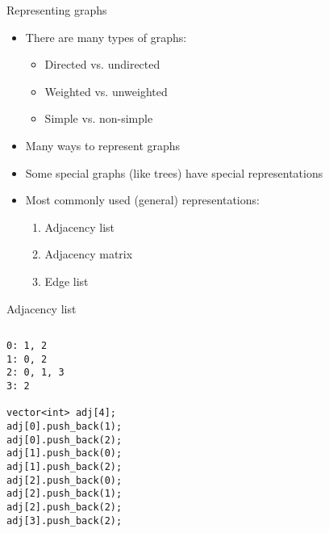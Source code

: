 \documentclass[12pt,t]{beamer}
\newcommand{\bi}{\begin{itemize}}
\newcommand{\ei}{\end{itemize}}
\begin{document}
\begin{frame}{Representing graphs}
    \vspace{20pt}
    \bi
        \item There are many types of graphs:
            \bi
                \item Directed vs. undirected
                \item Weighted vs. unweighted
                \item Simple vs. non-simple
            \ei
        \item Many ways to represent graphs
        \item Some special graphs (like trees) have special representations
        \item Most commonly used (general) representations:
            \begin{enumerate}
                \item Adjacency list
                \item Adjacency matrix
                \item Edge list
            \end{enumerate}
    \ei
\end{frame}

\begin{frame}[fragile]{Adjacency list}

    \begin{columns}[T]
        \begin{column}{.4\textwidth}
            \begin{verbatim}
0: 1, 2
1: 0, 2
2: 0, 1, 3
3: 2

vector<int> adj[4];
adj[0].push_back(1);
adj[0].push_back(2);
adj[1].push_back(0);
adj[1].push_back(2);
adj[2].push_back(0);
adj[2].push_back(1);
adj[2].push_back(2);
adj[3].push_back(2);
            \end{verbatim}
        \end{column}%
        \hfill%
        \begin{column}{.4\textwidth}
            \begin{figure}
            \end{figure}
        \end{column}%
    \end{columns}
\end{frame}
\end{document}

